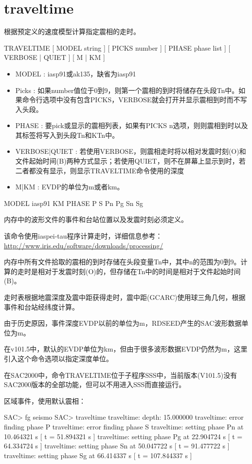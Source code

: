 \section{traveltime}
\label{cmd:traveltime}

根据预定义的速度模型计算指定震相的走时。

TRAVELTIME [ MODEL string ] [ PICKS number ] [ PHASE phase list ] [ VERBOSE | QUIET ] [ M | KM ]

\begin{itemize}
\item MODEL : iasp91或ak135，缺省为iasp91
\item Picks : 如果number值位于0到9，则第一个震相的到时将储存在头段Tn中。如果命令行选项中没有包含PICKS，VERBOSE就会打开并显示震相到时而不写入头段。
\item PHASE : 要pick或显示的震相列表，如果有PICKS n选项，则则震相到时以及其标签将写入到头段Tn和KTn中。 
\item VERBOSE|QUIET : 若使用VERBOSE，则震相走时将以相对发震时刻(O)和文件起始时间(B)两种方式显示；若使用QUIET，则不在屏幕上显示到时，若二者都没有显示，则显示TRAVELTIME命令使用的深度 
\item M|KM : EVDP的单位为m或者km。
\end{itemize}

MODEL iasp91 KM PHASE P S Pn Pg Sn Sg

内存中的波形文件的事件和台站位置以及发震时刻必须定义。

该命令使用iaspei-tau程序计算走时，详细信息参考：\\
\href{http://www.iris.edu/software/downloads/processing/}{http://www.iris.edu/software/downloads/processing/}

内存中所有文件拾取的震相的到时存储在头段变量Tn中，其中n的范围为0到9。计算的走时是相对于发震时刻(O)的，但存储在Tn中的时间是相对于文件起始时间(B)。

走时表根据地震深度及震中距获得走时，震中距(GCARC)使用球三角几何，根据事件和台站经纬度计算。

由于历史原因，事件深度EVDP以前的单位为m，RDSEED产生的SAC波形数据单位为m。

在v101.5中，默认的EVDP单位为km，但由于很多波形数据EVDP仍然为m，这里引入这个命令选项以指定深度单位。

在SAC2000中，命令TRAVELTIME位于子程序SSS中，当前版本(V101.5)没有SAC2000版本的全部功能，但可以不用进入SSS而直接运行。

区域事件，使用默认震相：
\begin{SACCode}
SAC> fg seismo
SAC> traveltime 
traveltime: depth: 15.000000
traveltime: error finding phase P       
traveltime: error finding phase S       
traveltime: setting phase Pn       at 10.464321 s [ t = 51.894321 s ]
traveltime: setting phase Pg       at 22.904724 s [ t = 64.334724 s ]
traveltime: setting phase Sn       at 50.047722 s [ t = 91.477722 s ]
traveltime: setting phase Sg      at 66.414337 s [ t = 107.844337 s ]
\end{SACCode} 

